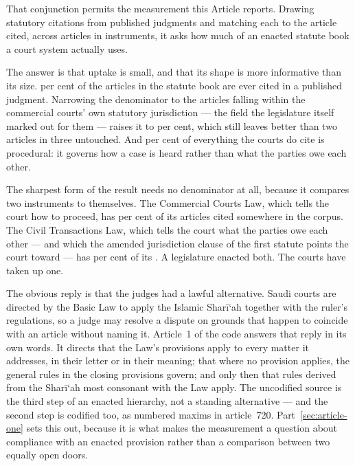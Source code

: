 \documentclass[12pt]{article}
\begin{document}
That conjunction permits the measurement this Article reports. Drawing
\nCitations{} statutory citations from \nJudgments{} published judgments and
matching each to the article cited, across \nRegistryArticles{} articles in
\nInstruments{} instruments, it asks how much of an enacted statute book a
court system actually uses.

The answer is that uptake is small, and that its shape is more informative
than its size. \nArticlesCitedShare{} per cent of the articles in the statute
book are ever cited in a published judgment. Narrowing the denominator to the
articles falling within the commercial courts' own statutory jurisdiction ---
the field the legislature itself marked out for them --- raises it to
\nScopeNarrowShare{} per cent, which still leaves better than two articles in
three untouched. And
\nProceduralShare{} per cent of everything the courts do cite is procedural:
it governs how a case is heard rather than what the parties owe each other.

The sharpest form of the result needs no denominator at all, because it
compares two instruments to themselves. The Commercial Courts Law, which tells
the court how to proceed, has \nCCLShare{} per cent of its
\nCCLArticles{} articles cited somewhere in the corpus. The Civil
Transactions Law, which tells the court what the parties owe each other --- and
which the amended jurisdiction clause of the first statute points the court
toward --- has \nCivilShare{} per cent of its \nCivilArticles{}. A legislature
enacted both. The courts have taken up one.

The obvious reply is that the judges had a lawful alternative. Saudi courts
are directed by the Basic Law to apply the Islamic Shar\=i`ah together with
the ruler's regulations, so a judge may resolve a dispute on grounds that
happen to coincide with an article without naming it. Article~1 of the code
answers that reply in its own words. It directs that the Law's provisions
apply to every matter it addresses, in their letter or in their meaning; that
where no provision applies, the general rules in the closing provisions
govern; and only then that rules derived from the Shar\=i`ah most consonant
with the Law apply. The uncodified source is the third step of an enacted
hierarchy, not a standing alternative --- and the second step is codified too,
as numbered maxims in article~720. Part~\ref{sec:article-one} sets this out,
because it is what makes the measurement a question about compliance with an
enacted provision rather than a comparison between two equally open doors.
\end{document}
